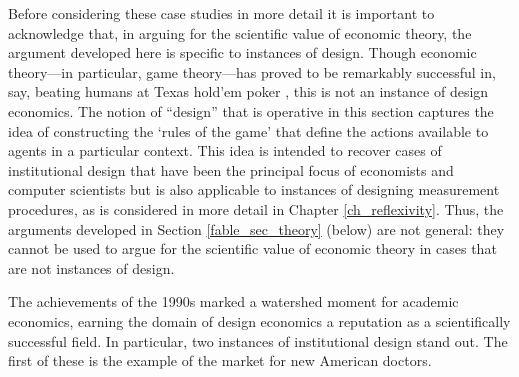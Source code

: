 Before considering these case studies in more detail it is important to acknowledge that, in arguing for the scientific value of economic theory, the argument developed here is specific to instances of design. Though economic theory---in particular, game theory---has proved to be remarkably successful in, say, beating humans at Texas hold'em poker \autocite{brown2019}, this is not an instance of design economics. The notion of ``design'' that is operative in this section captures the idea of constructing the `rules of the game' that define the actions available to agents in a particular context. This idea is intended to recover cases of institutional design that have been the principal focus of economists and computer scientists but is also applicable to instances of designing measurement procedures, as is considered in more detail in Chapter \ref{ch_reflexivity}. Thus, the arguments developed in Section \ref{fable_sec_theory} (below) are not general: they cannot be used to argue for the scientific value of economic theory in cases that are not instances of design. 

The achievements of the 1990s marked a watershed moment for academic economics, earning the domain of design economics a reputation as a scientifically successful field. In particular, two instances of institutional design stand out. The first of these is the example of the market for new American doctors.

